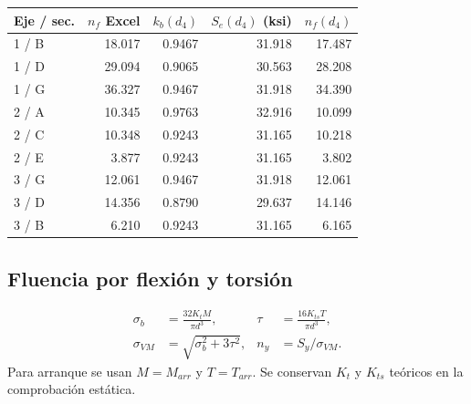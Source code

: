 \documentclass[11pt,a4paper]{article}
\begin{document}
\begin{center}\small\begin{tabular}{lrrrr}\toprule

Eje / sec. & $n_f$ Excel & $k_b(d_4)$ & $S_e(d_4)$ (ksi) & $n_f(d_4)$ \\ \midrule

1 / B & 18.017 & 0.9467 & 31.918 & 17.487 \\

1 / D & 29.094 & 0.9065 & 30.563 & 28.208 \\

1 / G & 36.327 & 0.9467 & 31.918 & 34.390 \\

2 / A & 10.345 & 0.9763 & 32.916 & 10.099 \\

2 / C & 10.348 & 0.9243 & 31.165 & 10.218 \\

2 / E & 3.877 & 0.9243 & 31.165 & 3.802 \\

3 / G & 12.061 & 0.9467 & 31.918 & 12.061 \\

3 / D & 14.356 & 0.8790 & 29.637 & 14.146 \\

3 / B & 6.210 & 0.9243 & 31.165 & 6.165 \\

\bottomrule\end{tabular}\end{center}

\subsection{Fluencia por flexión y torsión}
\begin{align*}
\sigma_b&=\frac{32K_tM}{\pi d^3},&\tau&=\frac{16K_{ts}T}{\pi d^3},\\
\sigma_{VM}&=\sqrt{\sigma_b^2+3\tau^2},&n_y&=S_y/\sigma_{VM}.
\end{align*}
Para arranque se usan $M=M_{arr}$ y $T=T_{arr}$. Se conservan $K_t$ y $K_{ts}$ teóricos en la comprobación estática.
\end{document}

